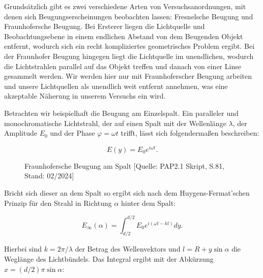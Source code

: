\documentclass{article}
\begin{document}
Grundsätzlich gibt es zwei verschiedene Arten von Versuchsanordnungen, mit denen sich Beugungserscheinungen beobachten lassen: Fresnelsche Beugung und Fraunhofersche Beugung. Bei Ersterer liegen die Lichtquelle und Beobachtungsebene in einem endlichen Abstand von dem Beugenden Objekt entfernt, wodurch sich ein recht kompliziertes geometrisches Problem ergibt. Bei der Fraunhofer Beugung hingegen liegt die Lichtquelle im unendlichen, wodurch die Lichtstrahlen parallel auf das Objekt treffen und danach von einer Linse gesammelt werden. Wir werden hier nur mit Fraunhoferscher Beugung arbeiten und unsere Lichtquellen als unendlich weit entfernt annehmen, was eine akzeptable Näherung in unserem Versuchs ein wird. 

Betrachten wir beispielhaft die Beugung am Einzelspalt. Ein paralleler und monochromatische Lichtstrahl, der auf einen Spalt mit der Wellenlänge $\lambda$, der Amplitude $E_0$ und der Phase $\varphi = \omega t$ trifft, lässt sich folgendermaßen beschreiben:

\begin{equation}
    E(y) = E_0 e^{i\omega t}.
\end{equation}

\begin{figure}[!t]
    \centering
    \caption{Fraunhofersche Beugung am Spalt [Quelle: PAP2.1 Skript, S.81, Stand: 02/2024]}
    \label{fig:fraunhofer}
\end{figure}

Bricht sich dieser an dem Spalt so ergibt sich nach dem Huygens-Fermat'schen Prinzip für den Strahl in Richtung $\alpha$ hinter dem Spalt:

\begin{equation}
    E_\infty (\alpha) = \int^{d/2}_{d/2} E_0 e^{i(\omega t - kl)} dy.
\end{equation}

Hierbei sind $k = 2\pi / \lambda$ der Betrag des Wellenvektors und $l = R + y \sin{\alpha}$ die Weglänge des Lichtbündels. Das Integral ergibt mit der Abkürzung $x = (d/2) \pi \sin{\alpha}$:
\end{document}
